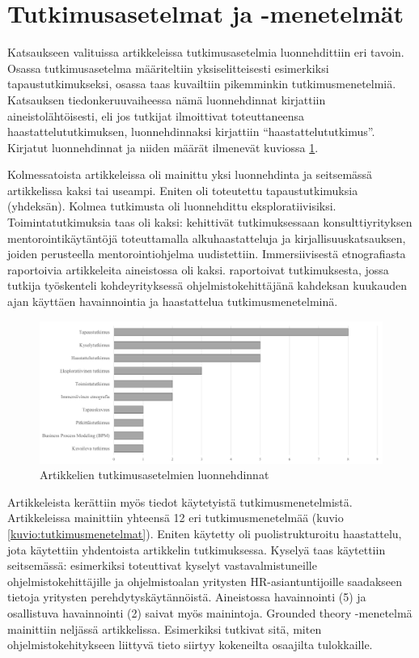 \documentclass[utf8]{gradu3}
\begin{document}
\section{Tutkimusasetelmat ja -menetelmät}
\label{luku-tulokset-tutkimustyypit-ja-menetelmat}

Katsaukseen valituissa artikkeleissa tutkimusasetelmia luonnehdittiin eri tavoin.
Osassa tutkimusasetelma määriteltiin yksiselitteisesti esimerkiksi tapaustutkimukseksi, osassa taas kuvailtiin pikemminkin tutkimusmenetelmiä. Katsauksen tiedonkeruuvaiheessa nämä luonnehdinnat kirjattiin aineistolähtöisesti, eli jos tutkijat ilmoittivat toteuttaneensa haastattelututkimuksen, luonnehdinnaksi kirjattiin ``haastattelututkimus''. Kirjatut luonnehdinnat ja niiden määrät ilmenevät kuviossa \ref{kuvio:tutkimustyypit}. 

Kolmessatoista artikkeleissa oli mainittu yksi luonnehdinta ja seitsemässä artikkelissa kaksi tai useampi. Eniten oli toteutettu tapaustutkimuksia (yhdeksän). Kolmea tutkimusta oli luonnehdittu eksploratiivisiksi. Toimintatutkimuksia taas oli kaksi: \textcite{bjornson-dingsøyr-2005} kehittivät tutkimuksessaan konsulttiyrityksen mentorointikäytäntöjä toteuttamalla alkuhaastatteluja ja kirjallisuuskatsauksen, joiden perusteella mentorointiohjelma uudistettiin. Immersiivisestä etnografiasta raportoivia artikkeleita aineistossa oli kaksi. \textcite{kumar-ym-2016} raportoivat tutkimuksesta, jossa tutkija työskenteli kohdeyrityksessä ohjelmistokehittäjänä kahdeksan kuukauden ajan käyttäen havainnointia ja haastattelua tutkimusmenetelminä.

\begin{figure}[h]
    \centering
    \includegraphics[width=\textwidth]{media/tutkimusasetelmat.png}
    \caption{Artikkelien tutkimusasetelmien luonnehdinnat}
    \label{kuvio:tutkimustyypit}
\end{figure}

Artikkeleista kerättiin myös tiedot käytetyistä tutkimusmenetelmistä. Artikkeleissa mainittiin yhteensä 12 eri tutkimusmenetelmää (kuvio \ref{kuvio:tutkimusmenetelmat}). Eniten käytetty oli puolistrukturoitu haastattelu, jota käytettiin yhdentoista artikkelin tutkimuksessa. Kyselyä taas käytettiin seitsemässä: esimerkiksi \textcite{kulkarni-ym-2010} toteuttivat kyselyt vastavalmistuneille ohjelmistokehittäjille ja ohjelmistoalan yritysten HR-asiantuntijoille saadakseen tietoja yritysten perehdytyskäytännöistä. Aineistossa havainnointi (5) ja osallistuva havainnointi (2) saivat myös mainintoja. Grounded theory -menetelmä mainittiin neljässä artikkelissa. Esimerkiksi \textcite{viana-ym-2014} tutkivat sitä, miten ohjelmistokehitykseen liittyvä tieto siirtyy kokeneilta osaajilta tulokkaille. 
\end{document}
